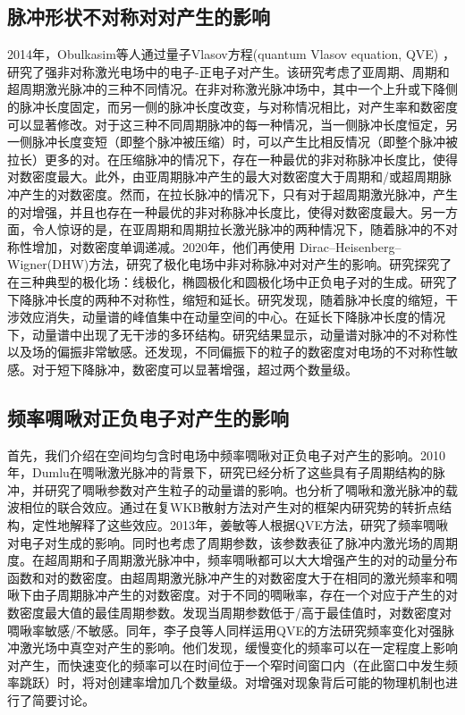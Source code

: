 \subsection{脉冲形状不对称对对产生的影响}

2014年，Obulkasim等人通过量子Vlasov方程(quantum Vlasov equation, QVE) ，研究了强非对称激光电场中的电子-正电子对产生\cite{2014as}。该研究考虑了亚周期、周期和超周期激光脉冲的三种不同情况。在非对称激光脉冲场中，其中一个上升或下降侧的脉冲长度固定，而另一侧的脉冲长度改变，与对称情况相比，对产生率和数密度可以显著修改。对于这三种不同周期脉冲的每一种情况，当一侧脉冲长度恒定，另一侧脉冲长度变短（即整个脉冲被压缩）时，可以产生比相反情况（即整个脉冲被拉长）更多的对。在压缩脉冲的情况下，存在一种最优的非对称脉冲长度比，使得对数密度最大。此外，由亚周期脉冲产生的最大对数密度大于周期和/或超周期脉冲产生的对数密度。然而，在拉长脉冲的情况下，只有对于超周期激光脉冲，产生的对增强，并且也存在一种最优的非对称脉冲长度比，使得对数密度最大。另一方面，令人惊讶的是，在亚周期和周期拉长激光脉冲的两种情况下，随着脉冲的不对称性增加，对数密度单调递减。2020年，他们再使用 Dirac–Heisenberg–Wigner(DHW)方法，研究了极化电场中非对称脉冲对对产生的影响\cite{2020as}。研究探究了在三种典型的极化场：线极化，椭圆极化和圆极化场中正负电子对的生成。研究了下降脉冲长度的两种不对称性，缩短和延长。研究发现，随着脉冲长度的缩短，干涉效应消失，动量谱的峰值集中在动量空间的中心。在延长下降脉冲长度的情况下，动量谱中出现了无干涉的多环结构。研究结果显示，动量谱对脉冲的不对称性以及场的偏振非常敏感。还发现，不同偏振下的粒子的数密度对电场的不对称性敏感。对于短下降脉冲，数密度可以显著增强，超过两个数量级。

\subsection{频率啁啾对正负电子对产生的影响}

首先，我们介绍在空间均匀含时电场中频率啁啾对正负电子对产生的影响。2010年，Dumlu在啁啾激光脉冲的背景下\cite{2010c}，研究已经分析了这些具有子周期结构的脉冲，并研究了啁啾参数对产生粒子的动量谱的影响。也分析了啁啾和激光脉冲的载波相位的联合效应。通过在复WKB散射方法对产生对的框架内研究势的转折点结构，定性地解释了这些效应。2013年，姜敏等人根据QVE方法，研究了频率啁啾对电子对生成的影响\cite{2013cj}。同时也考虑了周期参数，该参数表征了脉冲内激光场的周期度。在超周期和子周期激光脉冲中，频率啁啾都可以大大增强产生的对的动量分布函数和对的数密度。由超周期激光脉冲产生的对数密度大于在相同的激光频率和啁啾下由子周期脉冲产生的对数密度。对于不同的啁啾率，存在一个对应于产生的对数密度最大值的最佳周期参数。发现当周期参数低于/高于最佳值时，对数密度对啁啾率敏感/不敏感。同年，李子良等人同样运用QVE的方法研究频率变化对强脉冲激光场中真空对产生的影响\cite{2013cl}。他们发现，缓慢变化的频率可以在一定程度上影响对产生，而快速变化的频率可以在时间位于一个窄时间窗口内（在此窗口中发生频率跳跃）时，将对创建率增加几个数量级。对增强对现象背后可能的物理机制也进行了简要讨论。

